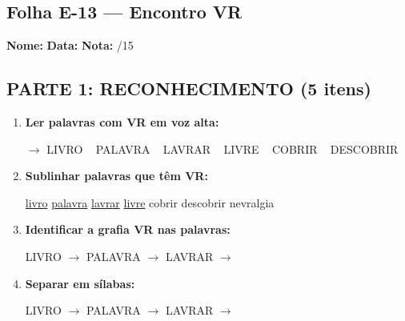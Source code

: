 \subsection{Folha E-13 --- Encontro VR}
\begin{exercicio}



\noindent\textbf{Nome:} \underline{\hspace{3.2cm}} \quad \textbf{Data:} \underline{\hspace{1.6cm}} \quad \textbf{Nota:} \underline{\hspace{0.9cm}}/15


\subsection*{PARTE 1: RECONHECIMENTO (5 itens)}

\begin{enumerate}

  \item \textbf{Ler palavras com VR em voz alta:}
  \begin{center}
  $\rightarrow$ LIVRO ~ PALAVRA ~ LAVRAR ~ LIVRE ~ COBRIR ~ DESCOBRIR
  \end{center}

  \item \textbf{Sublinhar palavras que têm VR:}

\begin{center}
  \uline{livro} \quad \uline{palavra} \quad \uline{lavrar} \quad \uline{livre} \quad cobrir \quad descobrir \quad nevralgia
\end{center}

  \item \textbf{Identificar a grafia VR nas palavras:}
  \begin{center}
  LIVRO $\rightarrow$ \underline{\hspace{1cm}} \quad PALAVRA $\rightarrow$ \underline{\hspace{1cm}} \quad LAVRAR $\rightarrow$ \underline{\hspace{1cm}}
  \end{center}

  \item \textbf{Separar em sílabas:}
  \begin{center}
  LIVRO $\rightarrow$ \underline{\hspace{1.2cm}} \quad PALAVRA $\rightarrow$ \underline{\hspace{1.2cm}} \quad LAVRAR $\rightarrow$ \underline{\hspace{1.2cm}}
  \end{center}


\end{enumerate}
\end{exercicio}
